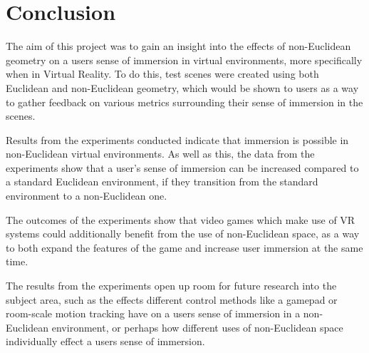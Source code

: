 \chapter{Conclusion}
\label{conclusion}

	The aim of this project was to gain an insight into the effects of non-Euclidean geometry on a users sense of immersion in virtual environments, more specifically when in Virtual Reality.
	To do this, test scenes were created using both Euclidean and non-Euclidean geometry, which would be shown to users as a way to gather feedback on various metrics surrounding their sense of immersion in the scenes. %

	Results from the experiments conducted indicate that immersion is possible in non-Euclidean virtual environments.
	As well as this, the data from the experiments show that a user's sense of immersion can be increased compared to a standard Euclidean environment, if they transition from the standard environment to a non-Euclidean one.

	The outcomes of the experiments show that video games which make use of VR systems could additionally benefit from the use of non-Euclidean space, as a way to both expand the features of the game and increase user immersion at the same time.

	The results from the experiments open up room for future research into the subject area, such as the effects different control methods like a gamepad or room-scale motion tracking have on a users sense of immersion in a non-Euclidean environment, or perhaps how different uses of non-Euclidean space individually effect a users sense of immersion.
